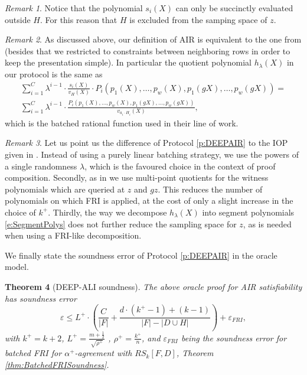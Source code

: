 \documentclass[11pt]{article}
\newtheorem{thm}{Theorem}[]
\theoremstyle{definition}
\theoremstyle{remark}
\newtheorem{rem}[thm]{Remark}
\begin{document}
\begin{rem}
Notice that the polynomial $s_i(X)$ can only be succinctly evaluated outside $H$.
For this reason that $H$ is excluded from the samping space of $z$.
\end{rem}

\begin{rem}
As discussed above, our definition of AIR is equivalent to the one from \cite{Starks, DEEPFRI, ethSTARK} (besides that we restricted to constraints between neighboring rows in order to keep the presentation simple). 
In particular the quotient polynomial $h_\lambda(X)$ in our protocol is the same as
\begin{multline*}
\sum_{i=1}^{C} \lambda^{i-1} \cdot\frac{ s_i(X)}{v_H(X)}\cdot P_i(p_1(X),\ldots ,p_w(X),p_1(gX), \ldots, p_w(gX)) =
\\
\sum_{i=1}^{C} \lambda^{i-1} \cdot \frac{P_i(p_1(X),\ldots ,p_w(X),p_1(gX), \ldots, p_w(gX))}{v_{a_i\cdot H_i}(X)},
\end{multline*}
which is the batched rational function used in their line of work.
\end{rem}
\begin{rem}
Let us point us the difference of Protocol \ref{p:DEEPAIR} to the IOP given in \cite{ethSTARK}.
Instead of using a purely linear batching strategy, we use the powers of a single randomness $\lambda$, which is the favoured choice in the context of proof composition.
Secondly, as in \cite{DEEPFRI} we use multi-point quotients for the witness polynomials which are queried at $z$ and $gz$. 
This reduces the number of polynomials on which FRI is applied, at the cost of only a slight increase in the choice of $k^+$.
Thirdly, the way we decompose $h_\lambda(X)$ into segment polynomials  \eqref{e:SegmentPolys} does not further reduce the sampling space for $z$, as is needed when using a FRI-like decomposition.
\end{rem}

We finally state the soundness error of Protocol \ref{p:DEEPAIR} in the oracle model.
\begin{thm}[DEEP-ALI soundness]
\label{thm:DEEPsoundness} 
The above oracle proof for AIR satisfiability has soundness error 
\begin{equation}
\label{e:SoundnessDEEPALI}
\varepsilon \leq L^+ \cdot \left(\frac{C}{|F|} + \frac{d\cdot (k^+ - 1) + (k - 1)}{|F| - |D\cup H|}\right) + \varepsilon_{FRI},
\end{equation}
with  $k^+ = k+2$,  $L^+ = \frac{m+\frac{1}{2}}{\sqrt{\rho^+}}$ , $\rho^+=\frac{k^+}{n}$, and $\varepsilon_{FRI}$ being the soundness error for batched FRI for $\alpha^+$-agreement with $RS_k[F,D]$, Theorem \ref{thm:BatchedFRISoundness}.
\end{thm}
\end{document}
